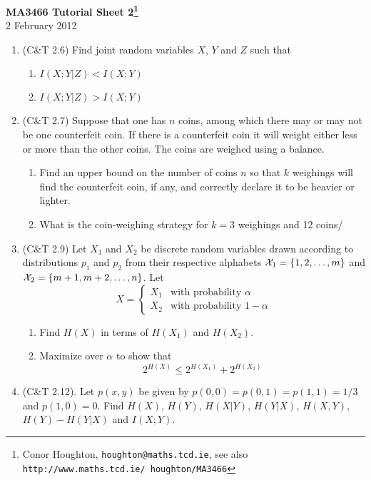 \documentclass[12pt]{article}
\begin{document}
\begin{center}
{\bf MA3466 Tutorial Sheet 2\footnote{Conor Houghton, {\tt houghton@maths.tcd.ie}, see also {\tt http://www.maths.tcd.ie/ houghton/MA3466}}}\\[1cm]{} 2 February 2012
\end{center}
\begin{enumerate}

\item (C\&T 2.6) Find joint random variables $X$, $Y$ and $Z$ such that 
\begin{enumerate}
\item $I(X;Y|Z)<I(X;Y)$
\item $I(X;Y|Z)>I(X;Y)$
\end{enumerate}

\item (C\&T 2.7) Suppose that one has $n$ coins, among which there may or may not be one counterfeit coin. If there is a counterfeit coin it will weight either less or more than the other coins. The coins are weighed using a balance.
\begin{enumerate}
\item Find an upper bound on the number of coins $n$ so that $k$ weighings will find the counterfeit coin, if any, and correctly declare it to be heavier or lighter.
\item What is the coin-weighing strategy for $k=3$ weighings and 12 coins/
\end{enumerate}

\item (C\&T 2.9) Let $X_1$ and $X_2$ be discrete random variables drawn according to distributions $p_1$ and $p_2$ from their respective alphabets ${\cal X}_1=\{1,2,\ldots,m\}$ and  ${\cal X}_2=\{m+1,m+2,\ldots,n\}$. Let
\begin{equation}
X=\left\{\begin{array}{ll}
X_1&\mbox{with probability $\alpha$}\\
X_2&\mbox{with probability $1-\alpha$}
\end{array}\right.
\end{equation}
\begin{enumerate}
\item Find $H(X)$ in terms of $H(X_1)$ and $H(X_2)$.
\item Maximize over $\alpha$ to show that 
\begin{equation}
2^{H(X)}\le 2^{H(X_1)}+2^{H(X_2)}
\end{equation}
\end{enumerate}

\item (C\&T 2.12). Let $p(x,y)$ be given by $p(0,0)=p(0,1)=p(1,1)=1/3$
  and $p(1,0)=0$. Find $H(X)$, $H(Y)$, $H(X|Y)$, $H(Y|X)$, $H(X,Y)$,
  $H(Y)-H(Y|X)$ and $I(X;Y)$.

\end{enumerate}
\end{document}
